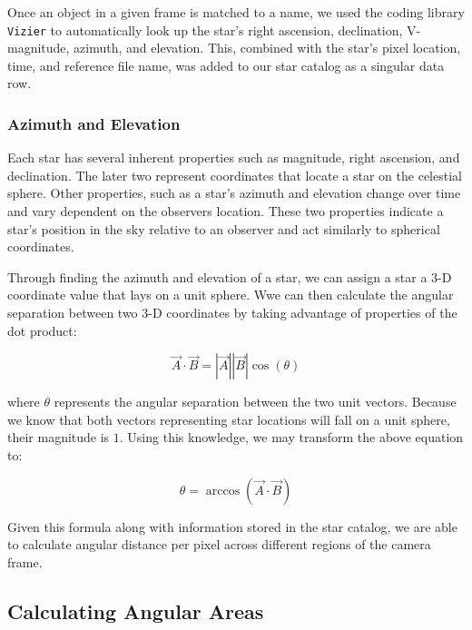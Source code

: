 Once an object in a given frame is matched to a name, we used the coding library \texttt{Vizier} to automatically look up the star's right ascension, declination, V-magnitude, azimuth, and elevation.  
This, combined with the star's pixel location, time, and reference file name, was added to our star catalog as a singular data row.

\subsubsection{Azimuth and Elevation}

Each star has several inherent properties such as magnitude, right ascension, and declination.  
The later two represent coordinates that locate a star on the celestial sphere.  
Other properties, such as a star's azimuth and elevation change over time and vary dependent on the observers location.  
These two properties indicate a star's position in the sky relative to an observer and act similarly to spherical coordinates.

Through finding the azimuth and elevation of a star, we can assign a star a 3-D coordinate value that lays on a unit sphere.  
Wwe can then calculate the angular separation between two 3-D coordinates by taking advantage of properties of the dot product:

$$ \vec{A} \cdot \vec{B} = |\vec{A}||\vec{B}| \cos{(\theta)} $$

where $\theta$ represents the angular separation between the two unit vectors.  
Because we know that both vectors representing star locations will fall on a unit sphere, their magnitude is $1$.
Using this knowledge, we may transform the above equation to:

$$ \theta = \arccos{(\vec{A} \cdot \vec{B})} $$

Given this formula along with information stored in the star catalog, we are able to calculate angular distance per pixel across different regions of the camera frame.


\subsection{Calculating Angular Areas}

